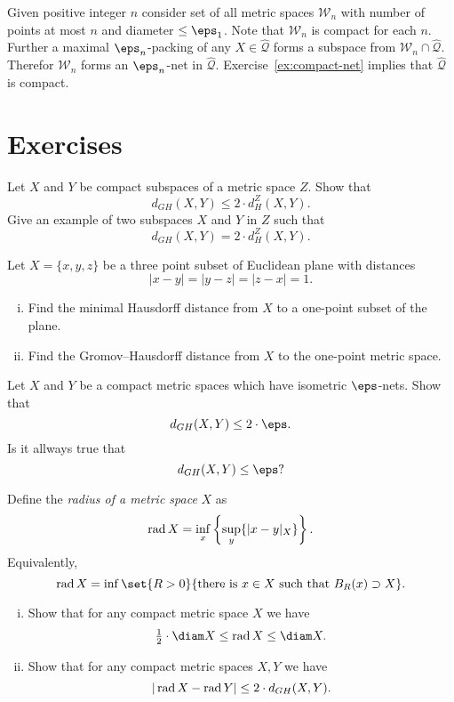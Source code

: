 Given positive integer $n$ consider set of all metric spaces $\mathcal{W}_n$
with number of points at most $n$ and diameter $\le \eps_1$.
Note that $\mathcal{W}_n$ is compact for each $n$.
Further a maximal $\eps_n$-packing of any $X\in\hat{\mathcal{Q}}$ forms a subspace from $\mathcal{W}_n\cap\hat{\mathcal{Q}}$.
Therefor $\mathcal{W}_n$ forms an $\eps_n$-net in  $\hat{\mathcal{Q}}$.
Exercise~\ref{ex:compact-net} implies that $\hat{\mathcal{Q}}$ is compact.
\qeds






\section*{Exercises}

\begin{pr}
Let $X$ and $Y$ be compact subspaces of a metric space $Z$.
Show that 
$$d_{GH}(X,Y)\le 2\cdot d^Z_H(X,Y).$$
Give an example of two subspaces $X$ and $Y$ in $Z$
such that
$$d_{GH}(X,Y)= 2\cdot d^Z_H(X,Y).$$
\end{pr}


\begin{pr}\label{pr:GH1}
Let $X=\{x,y,z\}$ be a three point subset of Euclidean plane with distances
$$|x-y|=|y-z|=|z-x|=1.$$
\begin{enumerate}[(i)]
\item Find the minimal Hausdorff distance from $X$ to a one-point subset of the plane.
\item Find the Gromov--Hausdorff distance from $X$ to the one-point metric space. 
\end{enumerate}
\end{pr}

\begin{pr}\label{pr:GH2}
Let $X$ and $Y$ be a compact metric spaces which have isometric $\eps$-nets.
Show that 
$$d_{GH}(X,Y)\le 2\cdot\eps.$$
Is it allways true that 
$$d_{GH}(X,Y)\le \eps?$$
\end{pr}




\def\rad{\mathop{\rm rad}}
\begin{pr}\label{pr:GH3}
Define the \emph{radius of a metric space} $X$ as 
$$\rad X=\inf_x\left\{\sup_y\{|x-y|_X\}\right\}.$$
Equivalently, 
$$\rad X=\inf\set{R>0}{\text{there is}\ x\in X\  \text{such that}\ B_R(x)\supset X}.$$
 
\begin{enumerate}[(i)]
\item Show that for any compact metric space $X$ we have
$$\tfrac12\cdot\diam X\le \rad X\le \diam X.$$
\item Show that for any compact metric spaces $X,Y$ we have
$$|\rad X-\rad Y|\le 2\cdot d_{GH}(X,Y).$$
\end{enumerate}
\end{pr}

